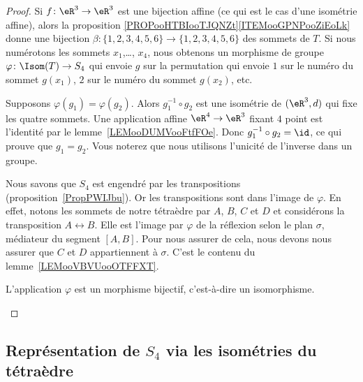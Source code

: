 \begin{proof}
	Si \( f\colon \eR^3\to \eR^3\) est une bijection affine (ce qui est le cas d'une isométrie affine), alors la proposition \ref{PROPooHTBIooTJQNZt}\ref{ITEMooGPNPooZiEoLk} donne une bijection \( \beta\colon \{ 1,2,3,4,5,6 \}\to \{ 1,2,3,4,5,6 \}\) des sommets de \( T\). Si nous numérotons les sommets \( x_1\),\ldots, \( x_4\), nous obtenons un morphisme de groupe \( \varphi\colon \Isom(T) \to S_4\) qui envoie \( g\) sur la permutation qui envoie \( 1\) sur le numéro du sommet \( g(x_1)\), \( 2\) sur le numéro du sommet \( g(x_2)\), etc.

	\begin{subproof}
		Supposons \( \varphi(g_1)=\varphi(g_2)\). Alors \( g_1^{-1}\circ g_2\) est une isométrie de \( (\eR^3,d)\) qui fixe les quatre sommets. Une application affine \( \eR^4\to\eR^3\) fixant \( 4\) point est l'identité par le lemme~\ref{LEMooDUMVooFtfFOe}. Donc \( g_1^{-1}\circ g_2=\id\), ce qui prouve que \( g_1=g_2\). Vous noterez que nous utilisons l'unicité de l'inverse dans un groupe.


		Nous savons que \( S_4\) est engendré par les transpositions (proposition~\ref{PropPWIJbu}). Or les transpositions sont dans l'image de \( \varphi\). En effet, notons les sommets de notre tétraèdre par \( A\), \( B\), \( C\) et \( D\) et considérons la transposition \( A\leftrightarrow B\). Elle est l'image par \( \varphi\) de la réflexion selon le plan \( \sigma\), médiateur du segment \( [A,B]\). Pour nous assurer de cela, nous devons nous assurer que \( C\) et \( D\) appartiennent à \( \sigma\). C'est le contenu du lemme~\ref{LEMooVBVUooOTFFXT}.

		\spitem[Conclusion]
		L'application \( \varphi\) est un morphisme bijectif, c'est-à-dire un isomorphisme.

	\end{subproof}
\end{proof}

\subsection{Représentation de \( S_4\) via les isométries du tétraèdre}
\label{SUBSECooVEASooDUbsBh}


